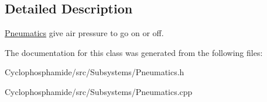 \subsection{Detailed Description}
\hyperlink{class_pneumatics}{Pneumatics} give air pressure to go on or off. 

The documentation for this class was generated from the following files\+:\begin{DoxyCompactItemize}
\item 
Cyclophosphamide/src/\+Subsystems/Pneumatics.\+h\item 
Cyclophosphamide/src/\+Subsystems/Pneumatics.\+cpp\end{DoxyCompactItemize}
